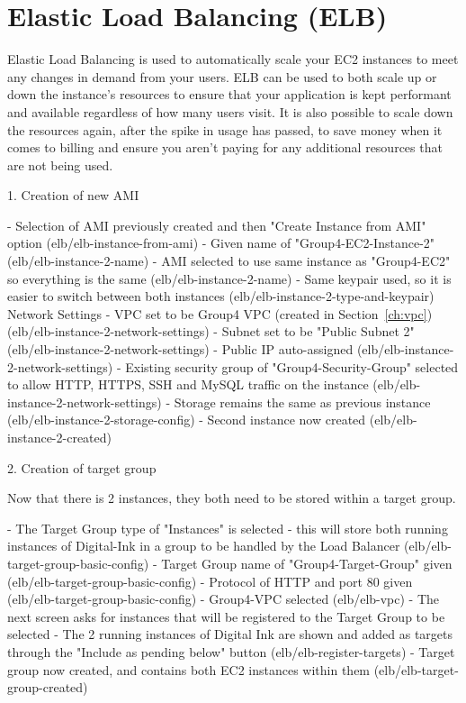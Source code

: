 \chapter{Elastic Load Balancing (ELB)}\label{ch:elastic-load-balancing}

Elastic Load Balancing is used to automatically scale your EC2 instances to meet any changes in demand from your users.
ELB can be used to both scale up or down the instance's resources to ensure that your application is kept performant and
available regardless of how many users visit.
It is also possible to scale down the resources again, after the spike in usage has passed, to save money when it comes
to billing and ensure you aren't paying for any additional resources that are not being used.

1. Creation of new AMI

- Selection of AMI previously created and then "Create Instance from AMI" option (elb/elb-instance-from-ami)
- Given name of "Group4-EC2-Instance-2" (elb/elb-instance-2-name)
- AMI selected to use same instance as "Group4-EC2" so everything is the same (elb/elb-instance-2-name)
- Same keypair used, so it is easier to switch between both instances (elb/elb-instance-2-type-and-keypair)
    Network Settings
- VPC set to be Group4 VPC  (created in Section~\ref{ch:vpc}) (elb/elb-instance-2-network-settings)
- Subnet set to be "Public Subnet 2" (elb/elb-instance-2-network-settings)
- Public IP auto-assigned (elb/elb-instance-2-network-settings)
- Existing security group of "Group4-Security-Group" selected to allow HTTP, HTTPS, SSH and MySQL traffic on the
instance (elb/elb-instance-2-network-settings)
- Storage remains the same as previous instance (elb/elb-instance-2-storage-config)
- Second instance now created (elb/elb-instance-2-created)

2. Creation of target group

Now that there is 2 instances, they both need to be stored within a target group.

- The Target Group type of "Instances" is selected - this will store both running instances of Digital-Ink in a group
to be handled by the Load Balancer (elb/elb-target-group-basic-config)
- Target Group name of "Group4-Target-Group" given (elb/elb-target-group-basic-config)
- Protocol of HTTP and port 80 given (elb/elb-target-group-basic-config)
- Group4-VPC selected (elb/elb-vpc)
- The next screen asks for instances that will be registered to the Target Group to be selected
- The 2 running instances of Digital Ink are shown and added as targets through the "Include as pending below"
button (elb/elb-register-targets)
- Target group now created, and contains both EC2 instances within them (elb/elb-target-group-created)

